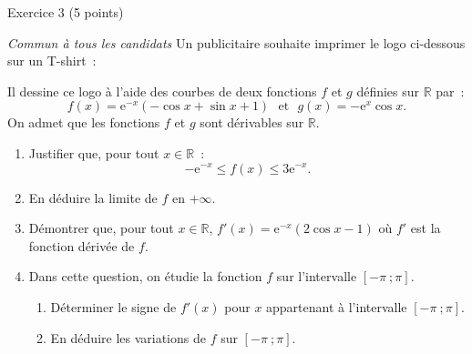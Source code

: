 
%
\begin{h2}Exercice 3 (5 points)\end{h2}
\smallbreak
\textit{Commun à tous les candidats}
\bigbreak
Un publicitaire souhaite imprimer le logo ci-dessous sur un T-shirt~:
\begin{center}
     \begin{extern}%
     \end{extern}
\end{center}
Il dessine ce logo à l'aide des courbes de deux fonctions $f$ et $g$ définies sur $\mathbb{R}$ par~:
\[
f(x)=\text{e}^{-x}(-\cos x+\sin x+1)\text{~~et~~}
g(x)=-\text{e}^{x}\cos x.
\]
On admet que les fonctions $f$ et $g$ sont dérivables sur $\mathbb{R}$.
\par
\medbreak
{}
\smallbreak
\begin{enumerate}
     \item Justifier que, pour tout $x\in\mathbb{R}$~:\[
     -\text{e}^{-x}\leqslant f(x)\leqslant 3\text{e}^{-x}.\]
     \item En déduire la limite de $f$ en $+\infty$.
     \item Démontrer que, pour tout $x\in\mathbb{R}$, $f'(x)=\text{e}^{-x}(2\cos x-1)$ où $f'$ est la fonction dérivée de $f$.
     \item Dans cette question, on étudie la fonction $f$ sur l'intervalle $[-\pi~;\pi]$.
     \begin{enumerate}[label=\alph*.]
          \item Déterminer le signe de $f'(x)$ pour $x$ appartenant à l'intervalle $[-\pi~;\pi]$.
          \item En déduire les variations de $f$ sur $[-\pi~;\pi]$.
     \end{enumerate}
\end{enumerate}
